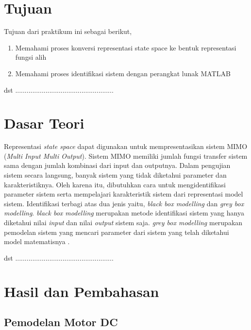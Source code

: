 \documentclass[../main.tex]{subfiles}
\begin{document}
    \section{Tujuan}
        Tujuan dari praktikum ini sebagai berikut,
        \begin{enumerate}
            \item Memahami proses konversi representasi state space ke bentuk representasi fungsi alih
            \item Memahami proses identifikasi sistem dengan perangkat lunak MATLAB
        \end{enumerate}
        dst ....................................................
        
    \section{Dasar Teori}
        Representasi \textit{state space} dapat digunakan untuk mempresentasikan sistem MIMO (\textit{Multi Input Multi Output}). Sistem MIMO memiliki jumlah fungsi transfer sistem sama dengan jumlah kombinasi dari input dan outputnya. Dalam pengujian sistem secara langsung, banyak sistem yang tidak diketahui parameter dan karakteristiknya. Oleh karena itu, dibutuhkan cara untuk mengidentifikasi parameter sistem serta mempelajari karakteristik sistem dari representasi model sistem. Identifikasi terbagi atas dua jenis yaitu, \textit{black box modelling} dan \textit{grey box modelling}. \textit{black box modelling} merupakan metode identifikasi sistem yang hanya diketahui nilai \textit{input} dan nilai \textit{output} sistem saja. \textit{grey box modelling} merupakan pemodelan sistem yang mencari parameter dari sistem yang telah diketahui model matematisnya \cite{fmz2023attitude,fmz2023trajectory}.
        
        dst ....................................................
        
        
    \section{Hasil dan Pembahasan}
        \subsection{Pemodelan Motor DC}
\end{document}
